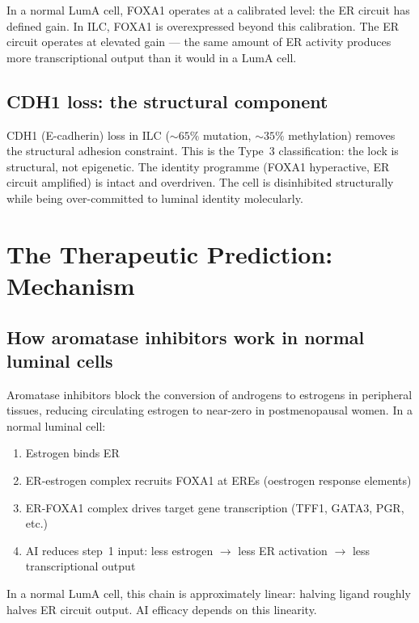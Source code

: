 \documentclass[12pt, a4paper]{article}
\begin{document}
In a normal LumA cell, FOXA1 operates at a
calibrated level: the ER circuit has defined gain.
In ILC, FOXA1 is overexpressed beyond this
calibration. The ER circuit operates at elevated
gain --- the same amount of ER activity produces
more transcriptional output than it would in a
LumA cell.

\subsection{CDH1 loss: the structural component}

CDH1 (E-cadherin) loss in ILC
(${\sim}65\%$ mutation, ${\sim}35\%$ methylation)
removes the structural adhesion constraint.
This is the Type~3 classification: the lock is
structural, not epigenetic. The identity programme
(FOXA1 hyperactive, ER circuit amplified) is intact
and overdriven. The cell is disinhibited structurally
while being over-committed to luminal identity
molecularly.

\section{The Therapeutic Prediction: Mechanism}

\subsection{How aromatase inhibitors work in
normal luminal cells}

Aromatase inhibitors block the conversion of
androgens to estrogens in peripheral tissues,
reducing circulating estrogen to near-zero in
postmenopausal women. In a normal luminal cell:

\begin{enumerate}
    \item Estrogen binds ER
    \item ER-estrogen complex recruits FOXA1
    at EREs (oestrogen response elements)
    \item ER-FOXA1 complex drives target
    gene transcription (TFF1, GATA3, PGR, etc.)
    \item AI reduces step~1 input: less estrogen
    $\rightarrow$ less ER activation $\rightarrow$
    less transcriptional output
\end{enumerate}

In a normal LumA cell, this chain is approximately
linear: halving ligand roughly halves ER circuit
output. AI efficacy depends on this linearity.
\end{document}
